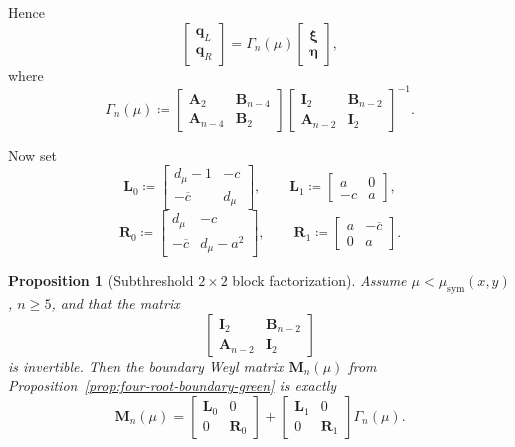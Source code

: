 \documentclass[11pt]{article}
\newtheorem{proposition}[theorem]{Proposition}
\begin{document}
Hence
\[
\begin{bmatrix}
\mathbf q_L\\
\mathbf q_R
\end{bmatrix}
=
\Gamma_n(\mu)
\begin{bmatrix}
\boldsymbol{\xi}\\
\boldsymbol{\eta}
\end{bmatrix},
\]
where
\[
\boxed{
\Gamma_n(\mu)\coloneqq
\begin{bmatrix}
\mathbf A_2 & \mathbf B_{n-4}\\
\mathbf A_{n-4} & \mathbf B_2
\end{bmatrix}
\begin{bmatrix}
\mathbf I_2 & \mathbf B_{n-2}\\
\mathbf A_{n-2} & \mathbf I_2
\end{bmatrix}^{-1}.
}
\]

Now set
\[
\mathbf L_0\coloneqq
\begin{bmatrix}
d_\mu-1 & -c\\
-\overline c & d_\mu
\end{bmatrix},
\qquad
\mathbf L_1\coloneqq
\begin{bmatrix}
a&0\\
-c&a
\end{bmatrix},
\]
\[
\mathbf R_0\coloneqq
\begin{bmatrix}
d_\mu & -c\\
-\overline c & d_\mu-a^2
\end{bmatrix},
\qquad
\mathbf R_1\coloneqq
\begin{bmatrix}
a&-\overline c\\
0&a
\end{bmatrix}.
\]

\begin{proposition}[Subthreshold \(2\times2\) block factorization]\label{prop:subthreshold-block-weyl}
Assume \(\mu<\mu_{\mathrm{sym}}(x,y)\), \(n\ge 5\), and that the matrix
\[
\begin{bmatrix}
\mathbf I_2 & \mathbf B_{n-2}\\
\mathbf A_{n-2} & \mathbf I_2
\end{bmatrix}
\]
is invertible. Then the boundary Weyl matrix \(\mathbf M_n(\mu)\) from Proposition~\ref{prop:four-root-boundary-green} is exactly
\[
\boxed{
\mathbf M_n(\mu)
=
\begin{bmatrix}
\mathbf L_0&0\\
0&\mathbf R_0
\end{bmatrix}
+
\begin{bmatrix}
\mathbf L_1&0\\
0&\mathbf R_1
\end{bmatrix}
\Gamma_n(\mu).
}
\]
\end{proposition}
\end{document}
